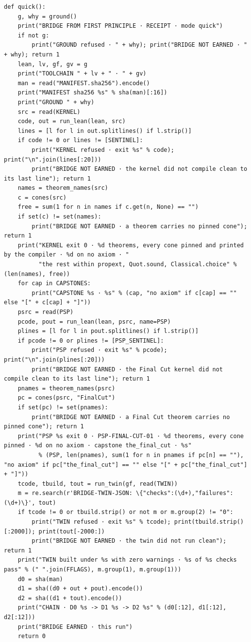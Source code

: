 \documentclass[10pt,twocolumn]{article}
\begin{document}
\begin{Verbatim}
def quick():
    g, why = ground()
    print("BRIDGE FROM FIRST PRINCIPLE · RECEIPT · mode quick")
    if not g:
        print("GROUND refused · " + why); print("BRIDGE NOT EARNED · " + why); return 1
    lean, lv, gf, gv = g
    print("TOOLCHAIN " + lv + " · " + gv)
    man = read("MANIFEST.sha256").encode()
    print("MANIFEST sha256 %s" % sha(man)[:16])
    print("GROUND " + why)
    src = read(KERNEL)
    code, out = run_lean(lean, src)
    lines = [l for l in out.splitlines() if l.strip()]
    if code != 0 or lines != [SENTINEL]:
        print("KERNEL refused · exit %s" % code); print("\n".join(lines[:20]))
        print("BRIDGE NOT EARNED · the kernel did not compile clean to its last line"); return 1
    names = theorem_names(src)
    c = cones(src)
    free = sum(1 for n in names if c.get(n, None) == "")
    if set(c) != set(names):
        print("BRIDGE NOT EARNED · a theorem carries no pinned cone"); return 1
    print("KERNEL exit 0 · %d theorems, every cone pinned and printed by the compiler · %d on no axiom · "
          "the rest within propext, Quot.sound, Classical.choice" % (len(names), free))
    for cap in CAPSTONES:
        print("CAPSTONE %s · %s" % (cap, "no axiom" if c[cap] == "" else "[" + c[cap] + "]"))
    psrc = read(PSP)
    pcode, pout = run_lean(lean, psrc, name=PSP)
    plines = [l for l in pout.splitlines() if l.strip()]
    if pcode != 0 or plines != [PSP_SENTINEL]:
        print("PSP refused · exit %s" % pcode); print("\n".join(plines[:20]))
        print("BRIDGE NOT EARNED · the Final Cut kernel did not compile clean to its last line"); return 1
    pnames = theorem_names(psrc)
    pc = cones(psrc, "FinalCut")
    if set(pc) != set(pnames):
        print("BRIDGE NOT EARNED · a Final Cut theorem carries no pinned cone"); return 1
    print("PSP %s exit 0 · PSP-FINAL-CUT-01 · %d theorems, every cone pinned · %d on no axiom · capstone the_final_cut · %s"
          % (PSP, len(pnames), sum(1 for n in pnames if pc[n] == ""), "no axiom" if pc["the_final_cut"] == "" else "[" + pc["the_final_cut"] + "]"))
    tcode, tbuild, tout = run_twin(gf, read(TWIN))
    m = re.search(r'BRIDGE-TWIN-JSON: \{"checks":(\d+),"failures":(\d+)\}', tout)
    if tcode != 0 or tbuild.strip() or not m or m.group(2) != "0":
        print("TWIN refused · exit %s" % tcode); print(tbuild.strip()[:2000]); print(tout[-2000:])
        print("BRIDGE NOT EARNED · the twin did not run clean"); return 1
    print("TWIN built under %s with zero warnings · %s of %s checks pass" % (" ".join(FFLAGS), m.group(1), m.group(1)))
    d0 = sha(man)
    d1 = sha((d0 + out + pout).encode())
    d2 = sha((d1 + tout).encode())
    print("CHAIN · D0 %s -> D1 %s -> D2 %s" % (d0[:12], d1[:12], d2[:12]))
    print("BRIDGE EARNED · this run")
    return 0



\end{Verbatim}
\end{document}
